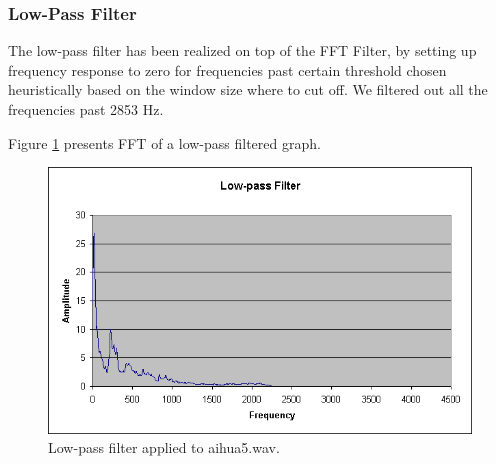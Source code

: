 \subsubsection{Low-Pass Filter}\label{sect:low-pass}

The low-pass filter has been realized on top of the FFT Filter,
by setting up frequency response to zero for frequencies
past certain threshold chosen heuristically
based on the window size where to cut off. We filtered out
all the frequencies past 2853 Hz.

Figure \ref{fig:low-pass} presents FFT of a
low-pass filtered graph.

\begin{figure}
	\centering
	\includegraphics[width=400pt]{../graphics/graphs/low-pass-filter.png}
	\caption{Low-pass filter applied to aihua5.wav.}
	\label{fig:low-pass}
\end{figure}
